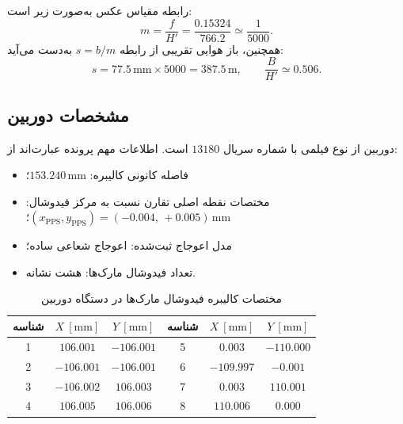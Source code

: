 \documentclass[12pt,a4paper]{article}
\newcommand{\code}[1]{\lr{\texttt{\detokenize{#1}}}}
\newcommand{\unit}[1]{\text{\lr{#1}}}
\renewcommand{\unit}[1]{\ensuremath{\mathrm{#1}}}
\begin{document}
رابطه مقیاس عکس به‌صورت زیر است:
\begin{equation}
  m=\frac{f}{H'}=\frac{0.15324}{766.2}\simeq\frac{1}{5000}.
\end{equation}
همچنین، باز هوایی تقریبی از رابطه \(s=b/m\) به‌دست می‌آید:
\begin{equation}
  s=77.5\,\mathrm{mm}\times5000=387.5\,\mathrm{m},
  \qquad
  \frac{B}{H'}\simeq0.506.
\end{equation}

\subsection{مشخصات دوربین}

دوربین از نوع فیلمی  با شماره سریال \(13180\) است. اطلاعات مهم پرونده
\code{RC20.txt} عبارت‌اند از:
\begin{itemize}[rightmargin=1.2em]
  \item فاصله کانونی کالیبره: \(153.240\,\mathrm{mm}\)؛
  \item مختصات نقطه اصلی تقارن نسبت به مرکز فیدوشال:
  \((x_{\mathrm{PPS}},y_{\mathrm{PPS}})=(-0.004,\,+0.005)\,\mathrm{mm}\)؛
  \item مدل اعوجاج ثبت‌شده: اعوجاج شعاعی ساده؛
  \item تعداد  فیدوشال مارک‌ها: هشت نشانه.
\end{itemize}

\begin{table}[H]
\centering
\caption{مختصات کالیبره فیدوشال مارک‌ها در دستگاه دوربین}
\label{tab:fiducial-calibration}
\begin{tabular}{ccc@{\qquad}ccc}
\toprule
\textbf{شناسه} & \(X~[\unit{mm}]\) & \(Y~[\unit{mm}]\) &
\textbf{شناسه} & \(X~[\unit{mm}]\) & \(Y~[\unit{mm}]\) \\
\midrule
1 & \(106.001\) & \(-106.001\) & 5 & \(0.003\) & \(-110.000\) \\
2 & \(-106.001\) & \(-106.001\) & 6 & \(-109.997\) & \(-0.001\) \\
3 & \(-106.002\) & \(106.003\) & 7 & \(0.003\) & \(110.001\) \\
4 & \(106.005\) & \(106.006\) & 8 & \(110.006\) & \(0.000\) \\
\bottomrule
\end{tabular}
\end{table}
\end{document}
